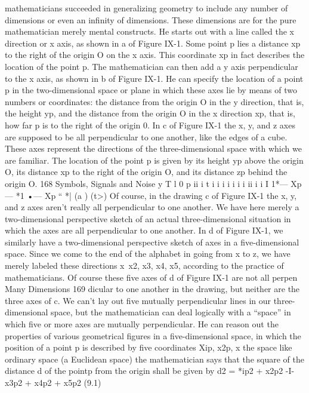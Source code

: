 {{{{{{{{{{mathematicians succeeded in generalizing geometry to include any
number of dimensions or even an infinity of dimensions.
These dimensions are for the pure mathematician merely mental
constructs. He starts out with a line called the x direction or x axis,
as shown in a of Figure IX-1. Some point p lies a distance xp to
the right of the origin O on the x axis. This coordinate xp in fact
describes the location of the point p.
The mathematician can then add a y axis perpendicular to the
x axis, as shown in b of Figure IX-1. He can specify the location
of a point p in the two-dimensional space or plane in which these
axes lie by means of two numbers or coordinates: the distance from
the origin O in the y direction, that is, the height yp, and the
distance from the origin O in the x direction xp, that is, how far p
is to the right of the origin 0.
In c of Figure IX-1 the x, y, and z axes are supposed to be all
perpendicular to one another, like the edges of a cube. These axes
represent the directions of the three-dimensional space with which
we are familiar. The location of the point p is given by its height
yp above the origin O, its distance xp to the right of the origin O,
and its distance zp behind the origin O.
168
Symbols, Signals and Noise
y
T
l
0 p
ii
i
t
i
i
i
i
i
i
i
ii i
i
I
1*— Xp — *1 •— Xp “ *|
(a ) (t>)
Of course, in the drawing c of Figure IX-1 the x, y, and z axes
aren’t really all perpendicular to one another. We have here merely
a two-dimensional perspective sketch of an actual three-dimensional
situation in which the axes are all perpendicular to one
another. In d of Figure IX-1, we similarly have a two-dimensional
perspective sketch of axes in a five-dimensional space. Since we
come to the end of the alphabet in going from x to z, we have
merely labeled these directions x\, x2, x3, x4, x5, according to the
practice of mathematicians.
Of course these five axes of d of Figure IX-1 are not all perpen
Many Dimensions
169
dicular to one another in the drawing, but neither are the three
axes of c. We can’t lay out five mutually perpendicular lines in our
three-dimensional space, but the mathematician can deal logically
with a “space” in which five or more axes are mutually perpendicular.
He can reason out the properties of various geometrical
figures in a five-dimensional space, in which the position of a point
p is described by five coordinates Xip, x2p, x%
the space like ordinary space (a Euclidean space) the mathematician
says that the square of the distance d of the pointp from the origin
shall be given by
d2 = *ip2 + x2p2 -I- x3p2 + x4p2 + x5p2 (9.1)
}}}}}}}}}}
